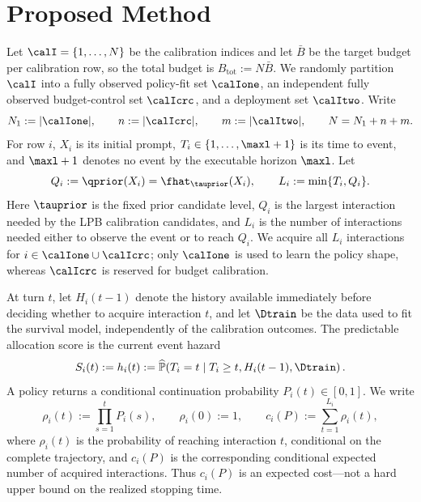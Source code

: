 
\section{Proposed Method}
\label{sec:method}

Let $\calI=\{1,\ldots,N\}$ be the calibration indices and let $\bar B$ be
the target budget per calibration row, so the total budget is
$B_{\mathrm{tot}}:=N\bar B$.  We randomly partition $\calI$ into a fully
observed policy-fit set $\calIone$, an independent fully observed budget-control
set $\calIcrc$, and a deployment set $\calItwo$.  Write
\[
    N_1:=|\calIone|,\qquad n:=|\calIcrc|,\qquad
    m:=|\calItwo|,\qquad N=N_1+n+m.
\]
For row $i$, $X_i$ is its initial prompt, $T_i\in\{1,\ldots,\maxl+1\}$ is
its time to event, and $\maxl+1$ denotes no event by the executable horizon
$\maxl$.  Let
\begin{equation}
    Q_i:=\qprior(X_i)=\fhat_{\tauprior}(X_i),
    \qquad L_i:=\min\{T_i,Q_i\}.
    \label{eq:dapro_main_active_length}
\end{equation}
Here $\tauprior$ is the fixed prior candidate level, $Q_i$ is the largest
interaction needed by the LPB calibration candidates, and $L_i$ is the number
of interactions needed either to observe the event or to reach $Q_i$.  We
acquire all $L_i$ interactions for $i\in\calIone\cup\calIcrc$; only
$\calIone$ is used to learn the policy shape, whereas $\calIcrc$ is reserved
for budget calibration.

At turn $t$, let $H_i(t-1)$ denote the history available immediately before
deciding whether to acquire interaction $t$, and let $\Dtrain$ be the data
used to fit the survival model, independently of the calibration outcomes.
The predictable allocation score is the current event hazard
\begin{equation}
    S_i(t):=h_i(t)
    :=\widehat{\mathbb P}\!\left(
      T_i=t\mid T_i\geq t,H_i(t-1),\Dtrain
    \right).
    \label{eq:dapro_main_hazard}
\end{equation}
A policy returns a conditional continuation probability $P_i(t)\in[0,1]$.
We write
\begin{equation}
    \rho_i(t):=\prod_{s=1}^{t}P_i(s),\qquad \rho_i(0):=1,
    \qquad
    c_i(P):=\sum_{t=1}^{L_i}\rho_i(t),
    \label{eq:dapro_main_reach_and_cost}
\end{equation}
where $\rho_i(t)$ is the probability of reaching interaction $t$, conditional
on the complete trajectory, and $c_i(P)$ is the corresponding conditional
expected number of acquired interactions.  Thus $c_i(P)$ is an expected
cost---not a hard upper bound on the realized stopping time.

